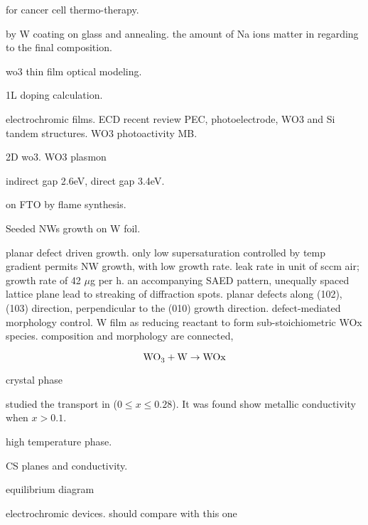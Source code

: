 for cancer cell thermo-therapy. \cite{Cheng2014}


 by W coating on glass and annealing.\cite{Azimirad2009a} the amount of Na ions matter in regarding to the final composition.\cite{Mann2007} 

wo3 thin film optical modeling. \cite{Saygin-Hinczewski2008}

 1L doping calculation. \cite{Ma2011}

electrochromic films. \cite{Yoshimura1985}
ECD \cite{Jiao2012} recent review \cite{Mortimer2011}
PEC, photoelectrode, WO3 and Si tandem structures.\cite{Coridan2013}
WO3 photoactivity MB. \cite{Watcharenwong2008}

2D wo3.\cite{Kalantar-zadeh2010a} 
WO3 plasmon \cite{Manthiram2012}

 indirect gap 2.6eV, direct gap 3.4eV. \cite{Koffyberg1979}

 on FTO by flame synthesis.\cite{Rao2014} \cite{Xu2006}

Seeded  NWs growth on W foil.\cite{Hong2006a}

planar defect driven  growth.\cite{Smith2014} only low supersaturation controlled by temp gradient permits NW growth, with low growth rate. leak rate in unit of sccm air; growth rate of 42 $\mu$g per h. an accompanying SAED pattern, unequally spaced lattice plane lead to streaking of diffraction spots. planar defects along (102), (103) direction, perpendicular to the (010) growth direction. defect-mediated morphology control. W film as reducing reactant to form sub-stoichiometric WOx species. composition and morphology are connected, 

\[
\cee{WO3 + W \rightarrow WOx}
\]


 crystal phase \cite{Viswanathan1974}

\citeauthor{Salje1984} studied the transport in  ($0\leq x \leq 0.28$).\cite{Salje1984} It was found  show metallic conductivity when $x > 0.1$.

 \cite{Migas2010}

 high temperature phase. \cite{Vogt1999}


 CS planes and conductivity.\cite{Sahle1983}

 equilibrium diagram \cite{Wriedt1989}

 electrochromic devices.\cite{Liu2013d} should compare with this one \cite{Wang2008}

